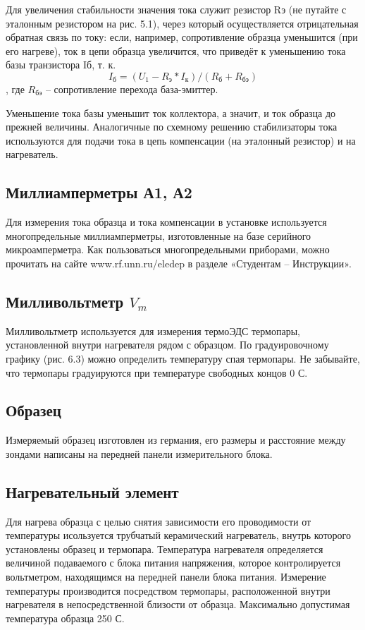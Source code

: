 
 Для увеличения стабильности значения тока служит резистор Rэ (не путайте с эталонным резистором на рис. 5.1), через который осуществляется отрицательная обратная связь по току: если, например, сопротивление образца уменьшится (при его нагреве), ток в цепи образца увеличится, что приведёт к уменьшению тока базы транзистора Iб, т. к.
$$I_\text{б} = (U_1 - R_\text{э}*I_\text{к}) / (R_\text{б} + R_\text{бэ})$$, где $R_\text{бэ}$ – сопротивление перехода база-эмиттер.

Уменьшение тока базы уменьшит ток коллектора, а значит, и ток образца до прежней величины.
Аналогичные по схемному решению стабилизаторы тока используются для подачи тока в цепь компенсации (на эталонный резистор) и на нагреватель.

\subsection{Миллиамперметры А1, А2}
Для измерения тока образца и тока компенсации в установке используется многопредельные миллиамперметры, изготовленные на базе серийного микроамперметра. Как пользоваться многопредельными приборами, можно прочитать на сайте www.rf.unn.ru/eledep в разделе «Студентам – Инструкции».

\subsection{Милливольтметр $V_m$}
Милливольтметр используется для измерения термоЭДС термопары, установленной внутри нагревателя рядом с образцом. По градуировочному графику (рис. 6.3) можно определить температуру спая термопары. Не забывайте, что термопары градуируются при температуре свободных концов 0 С.

\subsection{Образец}
Измеряемый образец изготовлен из германия, его размеры и расстояние между зондами написаны на передней панели измерительного блока.

\subsection{Нагревательный элемент}
Для нагрева образца с целью снятия зависимости его проводимости от температуры исользуется трубчатый керамический нагреватель, внутрь которого установлены образец и термопара. Температура нагревателя определяется величиной подаваемого с блока питания напряжения, которое контролируется вольтметром, находящимся на передней панели блока питания. Измерение температуры производится посредством термопары, расположенной внутри нагревателя в непосредственной близости от образца. Максимально допустимая температура образца 250 С.

